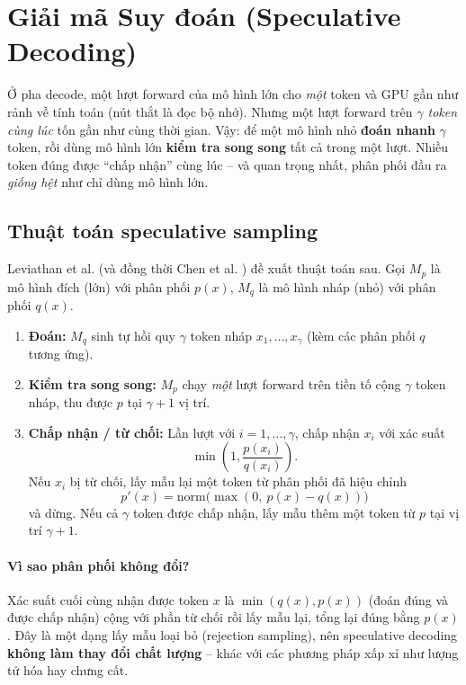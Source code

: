 
\section{Giải mã Suy đoán (Speculative Decoding) \newtag}
\label{sec:speculative_decoding}

\begin{tcolorbox}[title={Trực giác cốt lõi}, colback=yellow!10!white, colframe=yellow!50!black, fonttitle=\bfseries]
Ở pha decode, một lượt forward của mô hình lớn cho \emph{một} token và GPU gần như rảnh về tính toán (nút thắt là đọc bộ nhớ). Nhưng một lượt forward trên \emph{$\gamma$ token cùng lúc} tốn gần như cùng thời gian. Vậy: để một mô hình nhỏ \textbf{đoán nhanh} $\gamma$ token, rồi dùng mô hình lớn \textbf{kiểm tra song song} tất cả trong một lượt. Nhiều token đúng được “chấp nhận” cùng lúc -- và quan trọng nhất, phân phối đầu ra \emph{giống hệt} như chỉ dùng mô hình lớn.
\end{tcolorbox}

\subsection{Thuật toán speculative sampling}
\label{ssec:speculative_sampling}
Leviathan et al. \cite{leviathan2023speculative} (và đồng thời Chen et al. \cite{chen2023accelerating}) đề xuất thuật toán sau. Gọi $M_p$ là mô hình đích (lớn) với phân phối $p(x)$, $M_q$ là mô hình nháp (nhỏ) với phân phối $q(x)$.
\begin{enumerate}
	\item \textbf{Đoán:} $M_q$ sinh tự hồi quy $\gamma$ token nháp $x_1, \dots, x_\gamma$ (kèm các phân phối $q$ tương ứng).
	\item \textbf{Kiểm tra song song:} $M_p$ chạy \emph{một} lượt forward trên tiền tố cộng $\gamma$ token nháp, thu được $p$ tại $\gamma+1$ vị trí.
	\item \textbf{Chấp nhận / từ chối:} Lần lượt với $i = 1, \dots, \gamma$, chấp nhận $x_i$ với xác suất
	\[
	\min\left(1, \frac{p(x_i)}{q(x_i)}\right).
	\]
	Nếu $x_i$ bị từ chối, lấy mẫu lại một token từ phân phối đã hiệu chỉnh
	\[
	p'(x) = \text{norm}\big(\max(0,\ p(x) - q(x))\big)
	\]
	và dừng. Nếu cả $\gamma$ token được chấp nhận, lấy mẫu thêm một token từ $p$ tại vị trí $\gamma + 1$.
\end{enumerate}

\paragraph{Vì sao phân phối không đổi?} Xác suất cuối cùng nhận được token $x$ là $\min(q(x), p(x))$ (đoán đúng và được chấp nhận) cộng với phần từ chối rồi lấy mẫu lại, tổng lại đúng bằng $p(x)$. Đây là một dạng lấy mẫu loại bỏ (rejection sampling), nên speculative decoding \textbf{không làm thay đổi chất lượng} -- khác với các phương pháp xấp xỉ như lượng tử hóa hay chưng cất.

